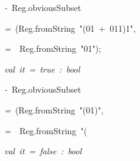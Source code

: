 \begin{list}{}
\item[]\textsl{-\ }Reg.obviousSubset
\item[]\textsl{=\ }(Reg.fromString\ "(01\ +\ 011)1",
\item[]\textsl{=\ }\ Reg.fromString\ "01");
\item[]\textsl{val\ it\ =\ true\ :\ bool}
\item[]\textsl{-\ }Reg.obviousSubset
\item[]\textsl{=\ }(Reg.fromString\ "(01)",
\item[]\textsl{=\ }\ Reg.fromString\ "(%
\item[]\textsl{val\ it\ =\ false\ :\ bool}
\end{list}
